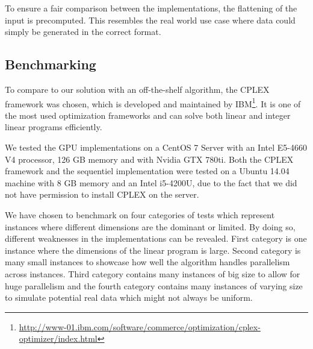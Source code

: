 To ensure a fair comparison between the implementations, the flattening of the input is precomputed. This resembles the real world use case where data could simply be generated in the correct format.

\subsection{Benchmarking}
To compare to our solution with an off-the-shelf algorithm, the CPLEX framework was chosen, which is developed and maintained by IBM\footnote{\url{http://www-01.ibm.com/software/commerce/optimization/cplex-optimizer/index.html}}. It is one of the most used optimization frameworks and can solve both linear and integer linear programs efficiently.

We tested the GPU implementations on a CentOS 7 Server with an Intel E5-4660 V4 processor, 126 GB memory and with Nvidia GTX 780ti. Both the CPLEX framework and the sequentiel 
implementation were tested on a Ubuntu 14.04 machine with 8 GB memory and an Intel i5-4200U, due to the fact that we did not have permission to install CPLEX on the server.

\newpar We have chosen to benchmark on four categories of tests which represent instances where different dimensions are the dominant or limited. By doing so, different weaknesses in the implementations can be revealed. First category is one instance where the dimensions of the linear program is large. Second category is many small instances to showcase how well the algorithm handles parallelism across instances. Third category contains many instances of big size to allow for huge parallelism and the fourth category contains many instances of varying size to simulate potential real data which might not always be uniform.